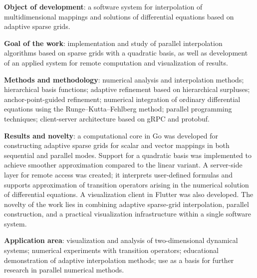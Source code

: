 \textbf{Object of development}: a software system for interpolation of multidimensional mappings and solutions of differential equations based on adaptive sparse grids.

\textbf{Goal of the work}: implementation and study of parallel interpolation algorithms based on sparse grids with a quadratic basis, as well as development of an applied system for remote computation and visualization of results.

\textbf{Methods and methodology}: numerical analysis and interpolation methods; hierarchical basis functions; adaptive refinement based on hierarchical surpluses; anchor-point-guided refinement; numerical integration of ordinary differential equations using the Runge--Kutta--Fehlberg method; parallel programming techniques; client-server architecture based on gRPC and protobuf.

\textbf{Results and novelty}: a computational core in Go was developed for constructing adaptive sparse grids for scalar and vector mappings in both sequential and parallel modes. Support for a quadratic basis was implemented to achieve smoother approximation compared to the linear variant. A server-side layer for remote access was created; it interprets user-defined formulas and supports approximation of transition operators arising in the numerical solution of differential equations. A visualization client in Flutter was also developed. The novelty of the work lies in combining adaptive sparse-grid interpolation, parallel construction, and a practical visualization infrastructure within a single software system.

\textbf{Application area}: visualization and analysis of two-dimensional dynamical systems; numerical experiments with transition operators; educational demonstration of adaptive interpolation methods; use as a basis for further research in parallel numerical methods.